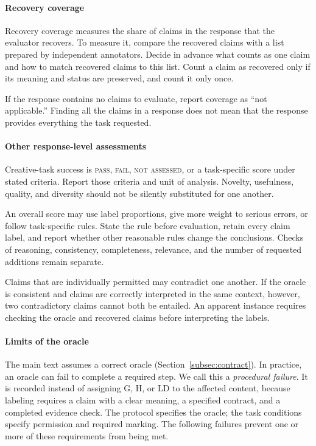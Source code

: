 \documentclass{clv2025}
\newcommand{\LD}{\textsc{LD}}
\newcommand{\Hall}{\textsc{H}}
\newcommand{\Grd}{\textsc{G}}
\begin{document}
\paragraph{Recovery coverage}
Recovery coverage measures the share of claims in the response that the
evaluator recovers. To measure it, compare the recovered claims with a
list prepared by independent annotators. Decide in advance what counts
as one claim and how to match recovered claims to this list. Count a
claim as recovered only if its meaning and status are preserved, and
count it only once.

If the response contains no claims to evaluate, report coverage as
``not applicable.'' Finding all the claims in a response does not mean
that the response provides everything the task requested.

\paragraph{Other response-level assessments}
Creative-task success is \textsc{pass}, \textsc{fail}, \textsc{not assessed},
or a task-specific score under stated criteria. Report those criteria and
unit of analysis. Novelty, usefulness, quality, and diversity should not be
silently substituted for one another.

An overall score may use label proportions, give more weight to serious
errors, or follow task-specific rules. State the rule before evaluation,
retain every claim label, and report whether other reasonable rules change
the conclusions. Checks of reasoning, consistency, completeness, relevance,
and the number of requested additions remain separate.

Claims that are individually permitted may contradict one another. If the
oracle is consistent and claims are correctly interpreted in the same context,
however, two contradictory claims cannot both be entailed. An apparent instance
requires checking the oracle and recovered claims before interpreting the labels.

\paragraph{Limits of the oracle}

The main text assumes a correct oracle (Section~\ref{subsec:contract}).
In practice, an oracle can fail to complete a required step. We call this
a \emph{procedural failure}. It is recorded instead of assigning \Grd,
\Hall, or \LD{} to the affected content, because labeling requires a claim
with a clear meaning, a specified contract, and a completed evidence
check. The protocol specifies the oracle; the task conditions specify
permission and required marking. The following failures prevent one or
more of these requirements from being met.
\end{document}

